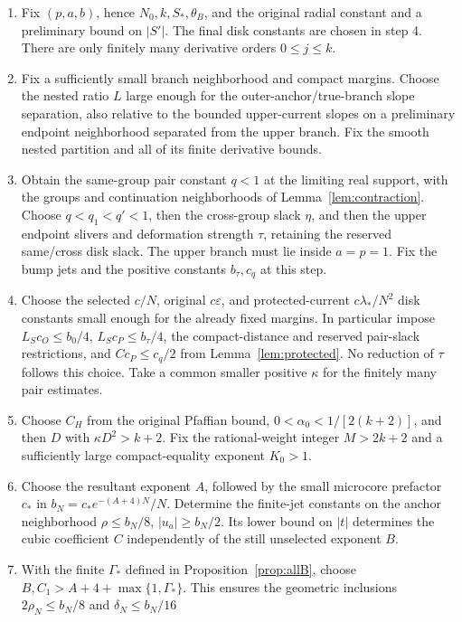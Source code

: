 \documentclass[11pt]{article}
\numberwithin{equation}{section}
\theoremstyle{definition}
\newcommand{\eps}{\varepsilon}
\begin{document}
\begin{enumerate}
\item Fix \((p,a,b)\), hence \(N_0,k,S_*,\theta_B\), and the
original radial constant and a preliminary bound on \(|S'|\).
The final disk constants are chosen in step 4. There are only finitely many
derivative orders \(0\le j\le k\).
\item Fix a sufficiently small branch neighborhood and compact
margins. Choose the nested ratio \(L\) large enough for the
outer-anchor/true-branch slope separation, also relative to the
bounded upper-current slopes on a preliminary endpoint neighborhood
separated from the upper branch. Fix the smooth nested
partition and all of its finite derivative bounds.
\item Obtain the same-group pair constant \(q<1\) at the limiting
real support, with the groups and continuation neighborhoods of
Lemma~\ref{lem:contraction}. Choose \(q<q_1<q'<1\), then the cross-group slack
\(\eta\), and then the upper endpoint slivers and deformation
strength \(\tau\), retaining the reserved same/cross disk slack.
The upper branch must lie inside \(a=p=1\). Fix the bump jets
and the positive constants \(b_\tau,c_q\) at this step.
\item Choose the selected \(c/N\), original \(c\eps\), and
protected-current \(c\lambda_*/N^2\) disk constants small enough
for the already fixed margins. In particular impose
\(L_Sc_O\le b_0/4\), \(L_Sc_P\le b_\tau/4\), the
compact-distance and reserved pair-slack restrictions, and
\(Cc_P\le c_q/2\) from Lemma~\ref{lem:protected}.
No reduction of \(\tau\) follows this choice. Take a common smaller positive
\(\kappa\) for the finitely many pair estimates.
\item Choose \(C_H\) from the original Pfaffian bound,
\(0<\alpha_0<1/[2(k+2)]\), and then \(D\) with
\(\kappa D^2>k+2\). Fix the rational-weight integer \(M>2k+2\)
and a sufficiently large compact-equality exponent \(K_0>1\).
\item Choose the resultant exponent \(A\), followed by the small
microcore prefactor \(c_*\) in \(b_N=c_*e^{-(A+4)N}/N\).
Determine the finite-jet constants on the anchor neighborhood
\(\rho\le b_N/8\), \(|u_a|\ge b_N/2\). Its lower bound on
\(|t|\) determines the cubic coefficient \(C\) independently of
the still unselected exponent \(B\).
\item With the finite \(\Gamma_*\) defined in
Proposition~\ref{prop:allB}, choose
\(B,C_1>A+4+\max\{1,\Gamma_*\}\). This ensures the geometric
inclusions \(2\rho_N\le b_N/8\) and \(\delta_N\le b_N/16\)

\end{enumerate}
\end{document}

